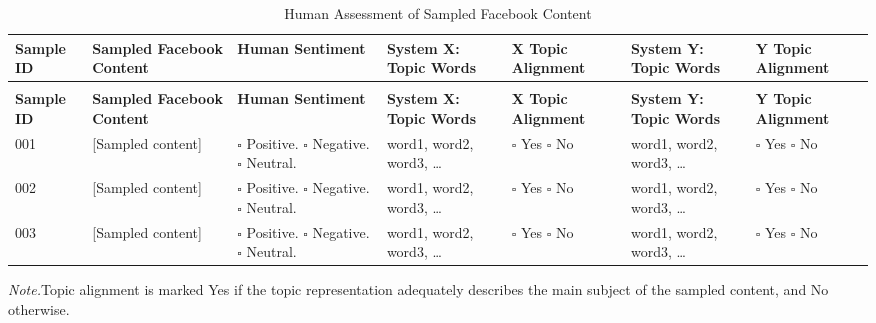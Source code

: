 \documentclass[12pt,a4paper]{report}
\begin{document}
		\begin{xltabular}{\textwidth}{
				| >{\centering\arraybackslash}p{0.9cm} |
				X |                        
				p{2.7cm} |
				X |                        
				>{\centering\arraybackslash}p{1.5cm} |
				X |                        
				>{\centering\arraybackslash}p{1.5cm} |
			}
			
			\caption{Human Assessment of Sampled Facebook Content}
			\label{tab:human-assessment}\\
			\hline
			
			\textbf{Sample ID} &
			\textbf{Sampled Facebook Content} &
			\textbf{Human Sentiment} &
			\textbf{System X: Topic Words} &
			\textbf{X Topic Alignment} &
			\textbf{System Y: Topic Words} &
			\textbf{Y Topic Alignment} \\
			\hline
			\endfirsthead
			
			\\
			\hline
			\textbf{Sample ID} &
			\textbf{Sampled Facebook Content} &
			\textbf{Human Sentiment} &
			\textbf{System X: Topic Words} &
			\textbf{X Topic Alignment} &
			\textbf{System Y: Topic Words} &
			\textbf{Y Topic Alignment} \\
			\hline
			\endhead
			\hline
			\endhead
			
			\hline
			\endfoot
			
			001 &
			[Sampled content] &
			$\square$ Positive. \newline
			$\square$ Negative. \newline
			$\square$ Neutral. &
			word1, word2, word3, \ldots &
			$\square$ Yes \quad $\square$ No &
			word1, word2, word3, \ldots &
			$\square$ Yes \quad $\square$ No \\
			\hline
			
			002 &
			[Sampled content] &
			$\square$ Positive. \newline
			$\square$ Negative. \newline
			$\square$ Neutral. &
			word1, word2, word3, \ldots &
			$\square$ Yes \quad $\square$ No &
			word1, word2, word3, \ldots &
			$\square$ Yes \quad $\square$ No \\
			\hline
			
			003 &
			[Sampled content] &
			$\square$ Positive. \newline
			$\square$ Negative. \newline
			$\square$ Neutral. &
			word1, word2, word3, \ldots &
			$\square$ Yes \quad $\square$ No &
			word1, word2, word3, \ldots &
			$\square$ Yes \quad $\square$ No \\
			\hline
			
		\end{xltabular}
	
	\normalsize
	
	\noindent
	\textit{Note.}Topic alignment is marked Yes if the
	topic representation adequately describes the main subject
	of the sampled content, and No otherwise.
\end{document}
